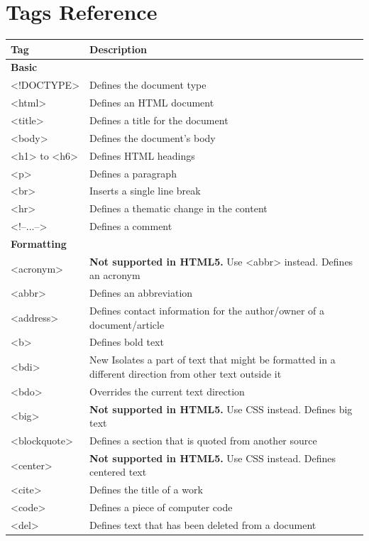 \documentclass[a4paper,oneside]{book}
\begin{document}
\section{Tags Reference}
\begin{longtable}[H]{| p{5cm} | p{10cm} |}
\hline
\textbf{Tag}	& \textbf{Description}\\ \hline 	
\multicolumn{2}{|l|}{\textbf{Basic}} \\ \hline
<!DOCTYPE> 	& Defines the document type \\ \hline 
<html>	& Defines an HTML document \\ \hline 
<title>	& Defines a title for the document \\ \hline 
<body>	& 	Defines the document's body \\ \hline  
<h1> to <h6>	& 	 Defines HTML headings \\ \hline 
<p>		& Defines a paragraph \\ \hline  
<br>		& Inserts a single line break \\ \hline 
<hr>		&  Defines a thematic change in the content \\ \hline 
<!--...-->		& Defines a comment \\ \hline 
\multicolumn{2}{|l|}{\textbf{Formatting}}	 \\ \hline
<acronym>	& \textbf{Not supported in HTML5.} Use <abbr> instead. 
Defines an acronym \\ \hline 
<abbr>		& Defines an abbreviation \\ \hline 
<address>		& Defines contact information for the author/owner of a document/article \\ \hline 
<b>		& Defines bold text \\ \hline 
<bdi>	& New	Isolates a part of text that might be formatted in a different direction from other text outside it \\ \hline 
<bdo>		& Overrides the current text direction \\ \hline 
<big>		& \textbf{Not supported in HTML5.} Use CSS instead.
Defines big text \\ \hline 
<blockquote>	& 	Defines a section that is quoted from another source \\ \hline 
<center>		& \textbf{Not supported in HTML5.} Use CSS instead.
Defines centered text \\ \hline 
<cite>		& Defines the title of a work \\ \hline 
<code>		& Defines a piece of computer code \\ \hline 
<del>		& Defines text that has been deleted from a document \\ \hline 

\end{longtable}
\end{document}
